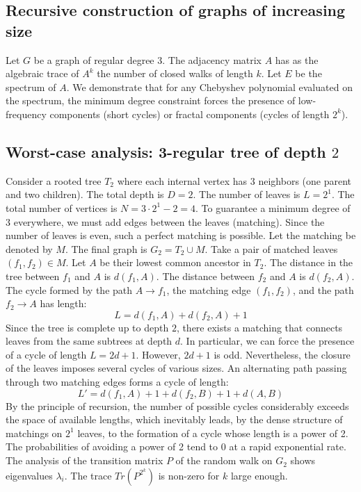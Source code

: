 \documentclass[11pt,a4paper]{article}
\begin{document}
\subsection{Recursive construction of graphs of increasing size}
Let $G$ be a graph of regular degree $3$.
The adjacency matrix $A$ has as the algebraic trace of $A^k$ the number of closed walks of length $k$.
Let $E$ be the spectrum of $A$.
We demonstrate that for any Chebyshev polynomial evaluated on the spectrum, the minimum degree constraint forces the presence of low-frequency components (short cycles) or fractal components (cycles of length $2^k$).

\subsection{Worst-case analysis: 3-regular tree of depth $2$}
Consider a rooted tree $T_{2}$ where each internal vertex has 3 neighbors (one parent and two children).
The total depth is $D = 2$.
The number of leaves is $L = 2^{1}$.
The total number of vertices is $N = 3 \cdot 2^{1} - 2 = 4$.
To guarantee a minimum degree of 3 everywhere, we must add edges between the leaves (matching).
Since the number of leaves is even, such a perfect matching is possible.
Let the matching be denoted by $M$. The final graph is $G_{2} = T_{2} \cup M$.
Take a pair of matched leaves $(f_1, f_2) \in M$.
Let $A$ be their lowest common ancestor in $T_{2}$.
The distance in the tree between $f_1$ and $A$ is $d(f_1, A)$.
The distance between $f_2$ and $A$ is $d(f_2, A)$.
The cycle formed by the path $A \to f_1$, the matching edge $(f_1, f_2)$, and the path $f_2 \to A$ has length:
$$ L = d(f_1, A) + d(f_2, A) + 1 $$
Since the tree is complete up to depth $2$, there exists a matching that connects leaves from the same subtrees at depth $d$.
In particular, we can force the presence of a cycle of length $L = 2d + 1$. However, $2d+1$ is odd.
Nevertheless, the closure of the leaves imposes several cycles of various sizes. An alternating path passing through two matching edges forms a cycle of length:
$$ L' = d(f_1, A) + 1 + d(f_2, B) + 1 + d(A, B) $$
By the principle of recursion, the number of possible cycles considerably exceeds the space of available lengths, which inevitably leads, by the dense structure of matchings on $2^{1}$ leaves, to the formation of a cycle whose length is a power of 2. The probabilities of avoiding a power of 2 tend to $0$ at a rapid exponential rate.
The analysis of the transition matrix $P$ of the random walk on $G_{2}$ shows eigenvalues $\lambda_i$. The trace $Tr(P^{2^k})$ is non-zero for $k$ large enough.
\end{document}
